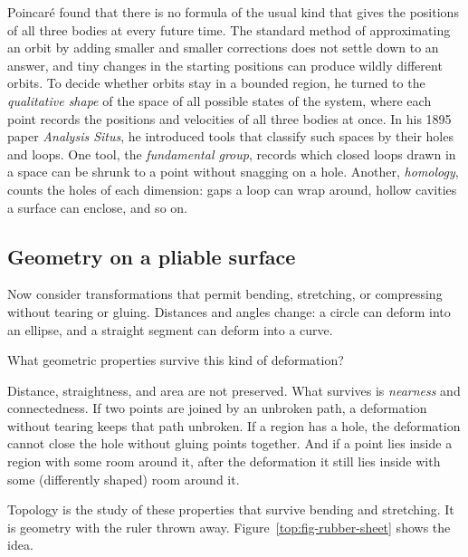 Poincar\'e found that there is no formula of the usual kind that gives the positions of all three bodies at every future time. The standard method of approximating an orbit by adding smaller and smaller corrections does not settle down to an answer, and tiny changes in the starting positions can produce wildly different orbits. To decide whether orbits stay in a bounded region, he turned to the \emph{qualitative shape} of the space of all possible states of the system, where each point records the positions and velocities of all three bodies at once. In his 1895 paper \emph{Analysis Situs}, he introduced tools that classify such spaces by their holes and loops. One tool, the \emph{fundamental group}, records which closed loops drawn in a space can be shrunk to a point without snagging on a hole. Another, \emph{homology}, counts the holes of each dimension: gaps a loop can wrap around, hollow cavities a surface can enclose, and so on.

\subsection{Geometry on a pliable surface}

Now consider transformations that permit bending, stretching, or compressing without tearing or gluing. Distances and angles change: a circle can deform into an ellipse, and a straight segment can deform into a curve.

What geometric properties survive this kind of deformation?

Distance, straightness, and area are not preserved. What survives is \emph{nearness} and connectedness. If two points are joined by an unbroken path, a deformation without tearing keeps that path unbroken. If a region has a hole, the deformation cannot close the hole without gluing points together. And if a point lies inside a region with some room around it, after the deformation it still lies inside with some (differently shaped) room around it.

Topology is the study of these properties that survive bending and stretching. It is geometry with the ruler thrown away. Figure~\ref{top:fig-rubber-sheet} shows the idea.

